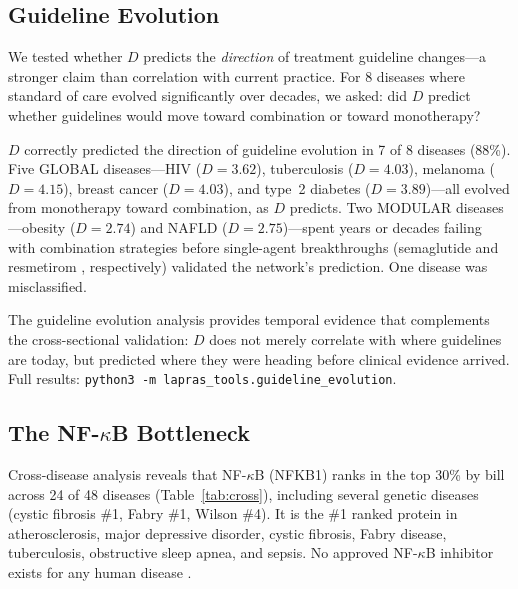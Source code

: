 \documentclass[11pt,a4paper]{article}
\begin{document}
\subsection{Guideline Evolution}

We tested whether $D$ predicts the \emph{direction} of treatment guideline changes---a stronger claim than correlation with current practice. For 8 diseases where standard of care evolved significantly over decades, we asked: did $D$ predict whether guidelines would move toward combination or toward monotherapy?

$D$ correctly predicted the direction of guideline evolution in 7 of 8 diseases (88\%). Five GLOBAL diseases---HIV ($D = 3.62$), tuberculosis ($D = 4.03$), melanoma ($D = 4.15$), breast cancer ($D = 4.03$), and type~2 diabetes ($D = 3.89$)---all evolved from monotherapy toward combination, as $D$ predicts. Two MODULAR diseases---obesity ($D = 2.74$) and NAFLD ($D = 2.75$)---spent years or decades failing with combination strategies before single-agent breakthroughs (semaglutide \citep{wilding2021} and resmetirom \citep{harrison2024}, respectively) validated the network's prediction. One disease was misclassified.

The guideline evolution analysis provides temporal evidence that complements the cross-sectional validation: $D$ does not merely correlate with where guidelines are today, but predicted where they were heading before clinical evidence arrived. Full results: \texttt{python3 -m lapras\_tools.guideline\_evolution}.

\subsection{The NF-\texorpdfstring{$\kappa$}{k}B Bottleneck}

Cross-disease analysis reveals that NF-$\kappa$B (NFKB1) ranks in the top 30\% by bill across 24 of 48 diseases (Table~\ref{tab:cross}), including several genetic diseases (cystic fibrosis \#1, Fabry \#1, Wilson \#4). It is the \#1 ranked protein in atherosclerosis, major depressive disorder, cystic fibrosis, Fabry disease, tuberculosis, obstructive sleep apnea, and sepsis. No approved NF-$\kappa$B inhibitor exists for any human disease \citep{taniguchi2018}.
\end{document}
